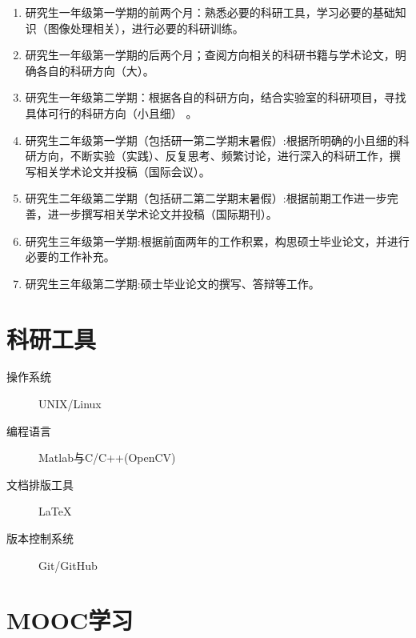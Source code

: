 \documentclass[a4paper，12pt]{article}
\begin{document}
\begin{enumerate}

\item 研究生一年级第一学期的前两个月：熟悉必要的科研工具，学习必要的基础知识（图像处理相关），进行必要的科研训练。

\item 研究生一年级第一学期的后两个月；查阅方向相关的科研书籍与学术论文，明确各自的科研方向（大）。

\item 研究生一年级第二学期：根据各自的科研方向，结合实验室的科研项目，寻找具体可行的科研方向（小且细）
。

\item 研究生二年级第一学期（包括研一第二学期末暑假）:根据所明确的小且细的科研方向，不断实验（实践）、反复思考、频繁讨论，进行深入的科研工作，撰写相关学术论文并投稿（国际会议）。

\item 研究生二年级第二学期（包括研二第二学期末暑假）:根据前期工作进一步完善，进一步撰写相关学术论文并投稿（国际期刊）。

\item 研究生三年级第一学期:根据前面两年的工作积累，构思硕士毕业论文，并进行必要的工作补充。

\item 研究生三年级第二学期:硕士毕业论文的撰写、答辩等工作。

\end{enumerate}

\section{科研工具}

\begin{description}

\item[操作系统] UNIX/Linux

\item[编程语言] Matlab与C/C++(OpenCV)

\item[文档排版工具] \LaTeX

\item[版本控制系统] Git/GitHub

\end{description}

\section{MOOC学习}
\end{document}
